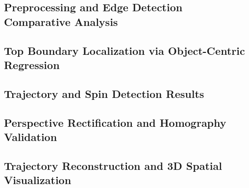 
\subsection{Preprocessing and Edge Detection Comparative Analysis}
\label{sec:comparative_analysis}


\subsection{Top Boundary Localization via Object-Centric Regression}


\subsection{Trajectory and Spin Detection Results}


\subsection{Perspective Rectification and Homography Validation}


\subsection{Trajectory Reconstruction and 3D Spatial Visualization}


